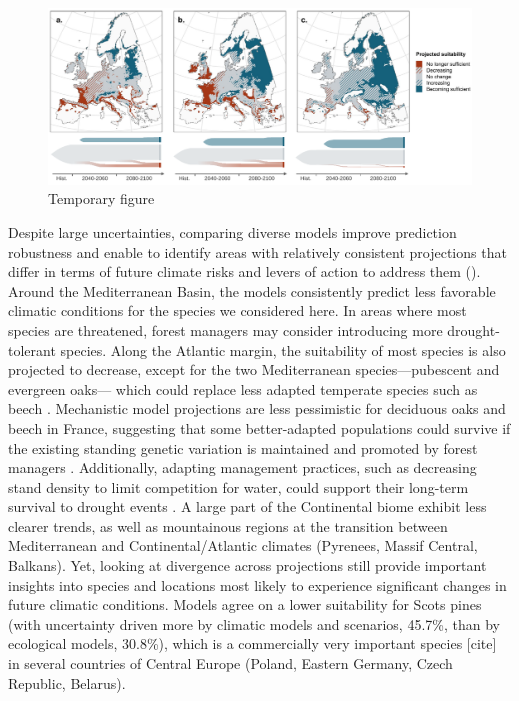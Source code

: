 \documentclass[11pt,letter]{article}
\begin{document}
\begin{figure}
	\centering
	\includegraphics[width=1\linewidth]{../newfigures/files/sankey/first_test.pdf}
	\caption{Temporary figure}
	\label{fig:diffproj}
\end{figure}

Despite large uncertainties, comparing diverse models improve prediction robustness and enable to identify areas with relatively consistent projections that differ in terms of future climate risks and levers of action to address them ().
Around the Mediterranean Basin, the models consistently predict less favorable climatic conditions for the species we considered here. In areas where most species are threatened, forest managers may consider introducing more drought-tolerant species. Along the Atlantic margin, the suitability of most species is also projected to decrease, except for the two Mediterranean species---pubescent and evergreen oaks--- which could replace less adapted temperate species such as beech \citep{Penuelas2003}. Mechanistic model projections are less pessimistic for deciduous oaks and beech in France, suggesting that some better-adapted populations could survive if the existing standing genetic variation is maintained and promoted by forest managers \citep{Brang2014}. Additionally, adapting management practices, such as decreasing stand density to limit competition for water, could support their long-term survival to drought events \citep{Young2023}.
A large part of the Continental biome exhibit less clearer trends, as well as mountainous regions at the transition between Mediterranean and Continental/Atlantic climates (Pyrenees, Massif Central, Balkans). Yet, looking at divergence across projections still provide important insights into species and locations most likely to experience significant changes in future climatic conditions. Models agree on a lower suitability for Scots pines (with uncertainty driven more by climatic models and scenarios, 45.7\%, than by ecological models, 30.8\%), which is a commercially very important species [cite] in several countries of Central Europe (Poland, Eastern Germany, Czech Republic, Belarus).
\end{document}
